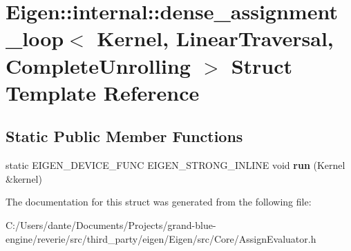 \hypertarget{struct_eigen_1_1internal_1_1dense__assignment__loop_3_01_kernel_00_01_linear_traversal_00_01_complete_unrolling_01_4}{}\section{Eigen\+::internal\+::dense\+\_\+assignment\+\_\+loop$<$ Kernel, Linear\+Traversal, Complete\+Unrolling $>$ Struct Template Reference}
\label{struct_eigen_1_1internal_1_1dense__assignment__loop_3_01_kernel_00_01_linear_traversal_00_01_complete_unrolling_01_4}
\subsection*{Static Public Member Functions}
\begin{DoxyCompactItemize}
\item 
\mbox{\label{struct_eigen_1_1internal_1_1dense__assignment__loop_3_01_kernel_00_01_linear_traversal_00_01_complete_unrolling_01_4_a57fe1a0c9f007a8da12440489e46159a}} 
static E\+I\+G\+E\+N\+\_\+\+D\+E\+V\+I\+C\+E\+\_\+\+F\+U\+NC E\+I\+G\+E\+N\+\_\+\+S\+T\+R\+O\+N\+G\+\_\+\+I\+N\+L\+I\+NE void {\bfseries run} (Kernel \&kernel)
\end{DoxyCompactItemize}


The documentation for this struct was generated from the following file\+:\begin{DoxyCompactItemize}
\item 
C\+:/\+Users/dante/\+Documents/\+Projects/grand-\/blue-\/engine/reverie/src/third\+\_\+party/eigen/\+Eigen/src/\+Core/Assign\+Evaluator.\+h\end{DoxyCompactItemize}
